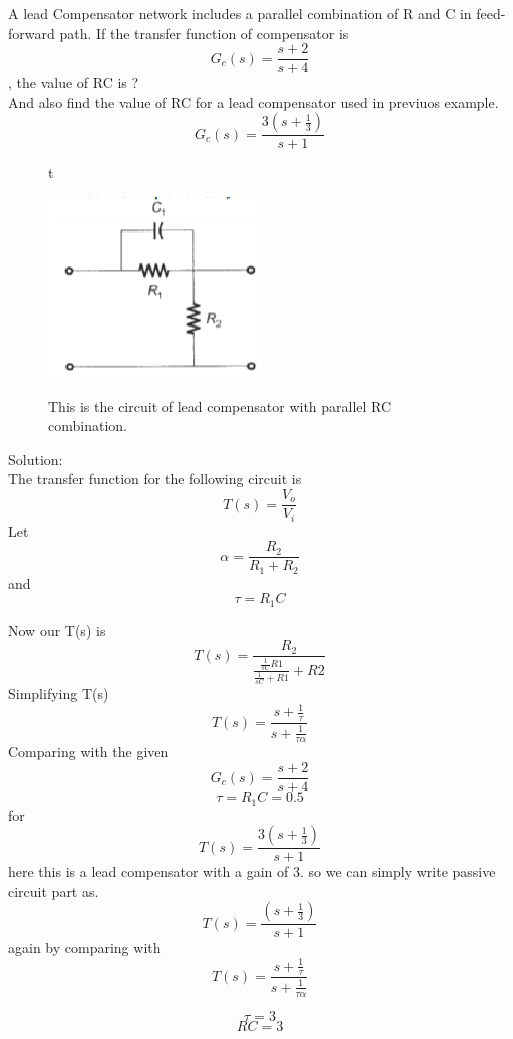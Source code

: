 \begin{enumerate}[label=\thesection.\arabic*.,ref=\thesection.\theenumi]

\begin{frame}
   A lead Compensator network includes a parallel combination of R and C in feed-forward path. If the transfer function of compensator  is $$G_c(s) = \frac{s+2}{s+4}$$, the value of RC is ?\\
   And also find the value of RC for a lead compensator used in previuos example. $$G_c(s) = \frac{3(s+\frac{1}{3})}{s+1}$$
\begin{figure}{t}
    \graphicspath{{./images/}}
    \includegraphics{figs/circuit_lead_compensator.eps}{}
    \centering
    \par
This is the circuit of lead compensator with parallel RC combination.
\end{figure}
Solution:\\
The transfer function for the following circuit is
    $$
    T(s) = \frac{V_o}{V_i}
    $$
    Let
    $$
    \alpha = \frac{R_2}{R_1 + R_2}
    $$
    and 
    $$
    \tau = R_1C
    $$

Now our T(s) is 
    $$
    T(s) = \frac{R_2}{\frac{\frac{1}{sC}R1}{\frac{1}{sC}+R1} + R2}
    $$
    Simplifying T(s)
    $$
    T(s) = \frac{s+\frac{1}{\tau}}{s+\frac{1}{\tau\alpha}}
    $$
    Comparing with the given $$G_c(s) = \frac{s+2}{s+4}$$
    $$
    \tau = R_1C = 0.5
    $$
    for
    $$
    T(s) = \frac{3(s+\frac{1}{3})}{s+1}
    $$
    here this is a lead compensator with a gain of 3.
    so we can simply write passive circuit part as.
     $$
    T(s) = \frac{(s+\frac{1}{3})}{s+1}
    $$
    again by comparing with 
    $$
    T(s) = \frac{s+\frac{1}{\tau}}{s+\frac{1}{\tau\alpha}}
    $$
    
    $$\tau = 3$$
    $$RC = 3$$
\end{frame}

\end{enumerate}
